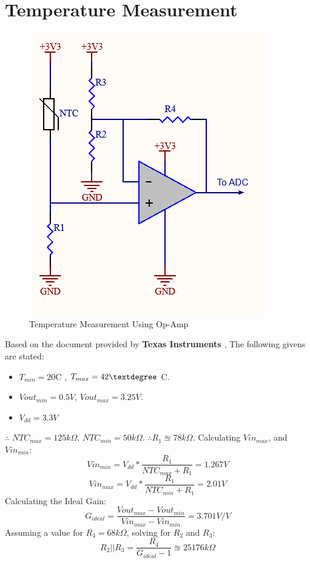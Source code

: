 \section{Temperature Measurement}

\begin{figure}[h!]
	\centering
	\includegraphics[scale=0.5]{./Figures/HW/Temperature Measurement.png}
	\caption{Temperature Measurement Using Op-Amp \cite{op_amp_temperature}}
	\label{fig:hw-temp-mes-append}
\end{figure}

Based on the document provided by \textbf{Texas Instruments} \cite{op_amp_temperature}, The following givens are stated:
\begin{itemize}
	\item $T_{min} = 20 $\textdegree C , $T_{max} = 42\textdegree$ \textdegree C.
	\item $Vout_{min} = 0.5 V$, $Vout_{max} = 3.25 V$.
	\item $V_{dd} = 3.3 V$
\end{itemize}
$\therefore$ $NTC_{max} = 125 k\Omega$, $NTC_{min} = 50 k\Omega$.
$\therefore R_1 \approxeq 78 k\Omega$.
Calculating $Vin_{max}$, and $Vin_{min}$:
\begin{equation}
	Vin_{min} = V_{dd} * \frac{R_1}{NTC_{max} + R_1} = 1.267 V
\end{equation}
\begin{equation}
	Vin_{max} = V_{dd} * \frac{R_1}{NTC_{min} + R_1} = 2.01 V
\end{equation}
Calculating the Ideal Gain:
\begin{equation}
	G_{ideal} = \frac{Vout_{max} - Vout_{min}}{Vin_{max} - Vin_{min}} = 3.701 V/V
\end{equation}
Assuming a value for $R_4 = 68 k\Omega$, solving for $R_2$ and $R_3$:
\begin{equation}
	R_2 || R_3 = \frac{R_4}{G_{ideal} - 1} \approxeq 25176 k\Omega
\end{equation}

